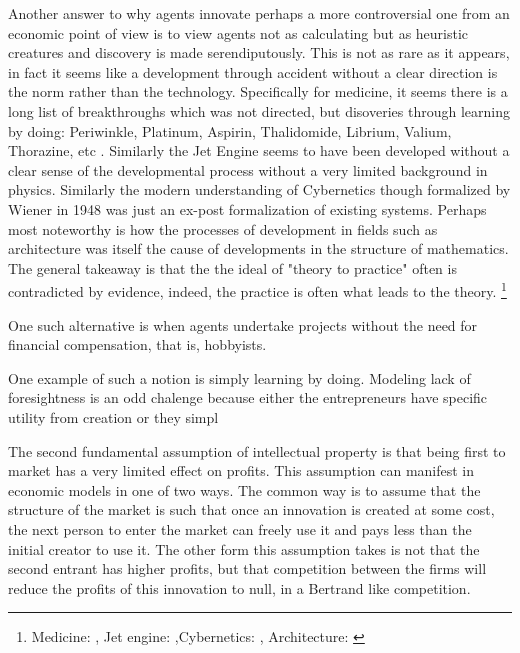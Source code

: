 \documentclass[12pt]{article}
\numberwithin{equation}{section}
\begin{document}
Another answer to why agents innovate perhaps a more controversial one from an economic point of view is to view agents not as calculating but as heuristic creatures and discovery is made serendiputously. This is not as rare as it appears, in fact it seems like a development through accident without a clear direction is the norm rather than the technology. Specifically for medicine, it seems there is a long list of breakthroughs which was not directed, but disoveries through learning by doing: Periwinkle, Platinum, Aspirin, Thalidomide, Librium, Valium, Thorazine, etc . Similarly the Jet Engine seems to have been developed without a clear sense of the developmental process without a very limited background in physics. Similarly the modern understanding of Cybernetics though formalized by Wiener in 1948 was just an ex-post formalization of existing systems. Perhaps most noteworthy is how the processes of development in fields such as architecture was itself the cause of developments in the structure of mathematics. The general takeaway is that the the ideal of "theory to practice" often is contradicted by evidence, indeed, the practice is often what leads to the theory. \footnote{ Medicine: \cite{meyers2007happy}, Jet engine: \cite{scranton2006urgency},Cybernetics: \cite{mindell2002between}, Architecture: \cite{unguru1992guy}}


One such alternative is when agents undertake projects without the need for financial compensation, that is, hobbyists. 

One example of such a notion is simply learning by doing. 
Modeling lack of foresightness is an odd chalenge because either the entrepreneurs have specific utility from creation or they simpl


The second fundamental assumption of intellectual property is that being first to market has a very limited effect on profits. This assumption can manifest in economic models in one of two ways. The common way is to assume that the structure of the market is such that once an innovation is created at some cost, the next person to enter the market can freely use it and pays less than the initial creator to use it. The other form this assumption takes is not that the second entrant has higher profits, but that competition between the firms will reduce the profits of this innovation to null, in a Bertrand like competition. 
\end{document}
